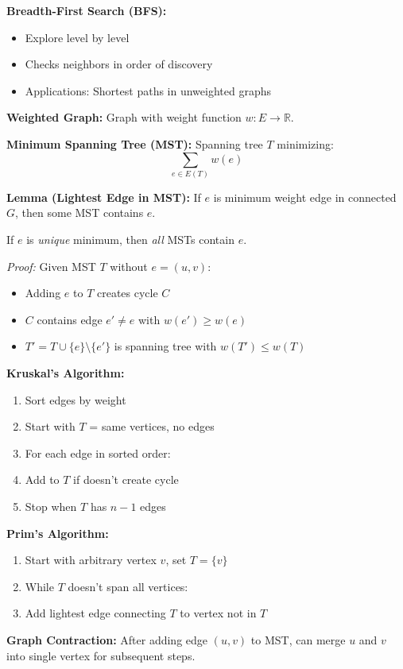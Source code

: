 \documentclass[10pt,landscape]{article}
\newcommand{\R}{\mathbb{R}}
\begin{document}
\begin{multicols}{3}
\textbf{Breadth-First Search (BFS):}
\begin{itemize}
    \item Explore level by level
    \item Checks neighbors in order of discovery
    \item Applications: Shortest paths in unweighted graphs
\end{itemize}

\textbf{Weighted Graph:} Graph with weight function $w: E \to \R$.

\textbf{Minimum Spanning Tree (MST):} Spanning tree $T$ minimizing:
$$\sum_{e \in E(T)} w(e)$$

\textbf{Lemma (Lightest Edge in MST):} If $e$ is minimum weight edge in connected $G$, then some MST contains $e$.

If $e$ is \textit{unique} minimum, then \textit{all} MSTs contain $e$.

\textit{Proof:} Given MST $T$ without $e = (u,v)$:
\begin{itemize}
    \item Adding $e$ to $T$ creates cycle $C$
    \item $C$ contains edge $e' \neq e$ with $w(e') \geq w(e)$
    \item $T' = T \cup \{e\} \setminus \{e'\}$ is spanning tree with $w(T') \leq w(T)$
\end{itemize}

\textbf{Kruskal's Algorithm:}
\begin{enumerate}
    \item Sort edges by weight
    \item Start with $T$ = same vertices, no edges
    \item For each edge in sorted order:
    \item[] Add to $T$ if doesn't create cycle
    \item Stop when $T$ has $n-1$ edges
\end{enumerate}

\textbf{Prim's Algorithm:}
\begin{enumerate}
    \item Start with arbitrary vertex $v$, set $T = \{v\}$
    \item While $T$ doesn't span all vertices:
    \item[] Add lightest edge connecting $T$ to vertex not in $T$
\end{enumerate}

\textbf{Graph Contraction:} After adding edge $(u,v)$ to MST, can merge $u$ and $v$ into single vertex for subsequent steps.


\end{multicols}
\end{document}

